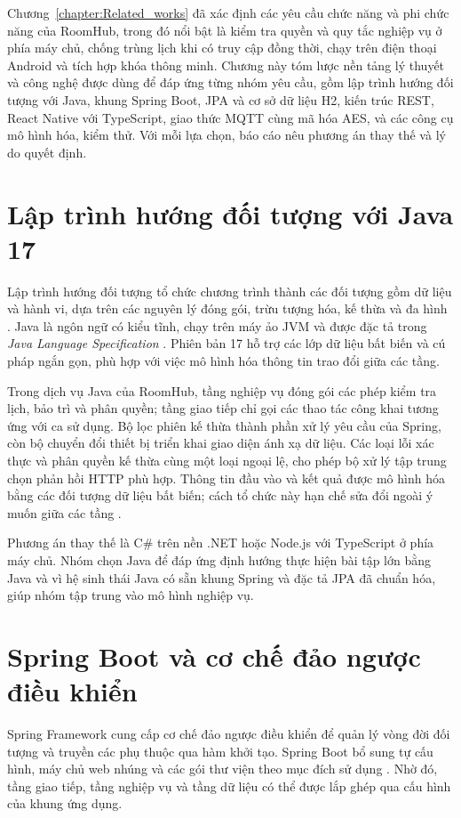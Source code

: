 \documentclass[../DoAn.tex]{subfiles}
\begin{document}
Chương~\ref{chapter:Related_works} đã xác định các yêu cầu chức năng và phi chức năng của RoomHub, trong đó nổi bật là kiểm tra quyền và quy tắc nghiệp vụ ở phía máy chủ, chống trùng lịch khi có truy cập đồng thời, chạy trên điện thoại Android và tích hợp khóa thông minh. Chương này tóm lược nền tảng lý thuyết và công nghệ được dùng để đáp ứng từng nhóm yêu cầu, gồm lập trình hướng đối tượng với Java, khung Spring Boot, JPA và cơ sở dữ liệu H2, kiến trúc REST, React Native với TypeScript, giao thức MQTT cùng mã hóa AES, và các công cụ mô hình hóa, kiểm thử. Với mỗi lựa chọn, báo cáo nêu phương án thay thế và lý do quyết định.

\section{Lập trình hướng đối tượng với Java 17}
\label{section:3.1}
Lập trình hướng đối tượng tổ chức chương trình thành các đối tượng gồm dữ liệu và hành vi, dựa trên các nguyên lý đóng gói, trừu tượng hóa, kế thừa và đa hình \cite{gamma1994design}. Java là ngôn ngữ có kiểu tĩnh, chạy trên máy ảo JVM và được đặc tả trong \emph{Java Language Specification} \cite{gosling2021jls}. Phiên bản 17 hỗ trợ các lớp dữ liệu bất biến và cú pháp ngắn gọn, phù hợp với việc mô hình hóa thông tin trao đổi giữa các tầng.

Trong dịch vụ Java của RoomHub, tầng nghiệp vụ đóng gói các phép kiểm tra lịch, bảo trì và phân quyền; tầng giao tiếp chỉ gọi các thao tác công khai tương ứng với ca sử dụng. Bộ lọc phiên kế thừa thành phần xử lý yêu cầu của Spring, còn bộ chuyển đổi thiết bị triển khai giao diện ánh xạ dữ liệu. Các loại lỗi xác thực và phân quyền kế thừa cùng một loại ngoại lệ, cho phép bộ xử lý tập trung chọn phản hồi HTTP phù hợp. Thông tin đầu vào và kết quả được mô hình hóa bằng các đối tượng dữ liệu bất biến; cách tổ chức này hạn chế sửa đổi ngoài ý muốn giữa các tầng \cite{bloch2018effective}.

Phương án thay thế là C\# trên nền .NET hoặc Node.js với TypeScript ở phía máy chủ. Nhóm chọn Java để đáp ứng định hướng thực hiện bài tập lớn bằng Java và vì hệ sinh thái Java có sẵn khung Spring và đặc tả JPA đã chuẩn hóa, giúp nhóm tập trung vào mô hình nghiệp vụ.

\section{Spring Boot và cơ chế đảo ngược điều khiển}
\label{section:3.2}
Spring Framework cung cấp cơ chế đảo ngược điều khiển để quản lý vòng đời đối tượng và truyền các phụ thuộc qua hàm khởi tạo. Spring Boot bổ sung tự cấu hình, máy chủ web nhúng và các gói thư viện theo mục đích sử dụng \cite{springboot34}. Nhờ đó, tầng giao tiếp, tầng nghiệp vụ và tầng dữ liệu có thể được lắp ghép qua cấu hình của khung ứng dụng.
\end{document}
